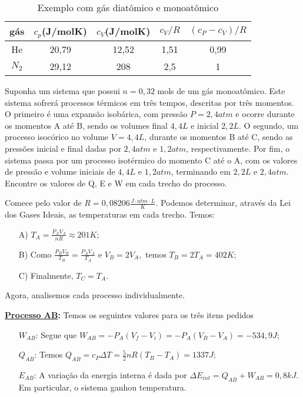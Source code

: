 \documentclass[phsyicsII_notes.tex]{subfiles}
\begin{document}
\begin{center}
	\begin{table}[h!]
		\caption{Exemplo com gás diatômico e monoatômico}
		\centering
		\begin{tabular}{| c | c | c | c | c |}
			\hline
			gás       & \(c_{p}\)(J/molK) & \(c_{V}\)(J/molK) & \(c_{V}/R\) & \((c_{P}-c_{V})/R\) \\
			\hline
			He        & 20,79             & 12,52             & 1,51        & 0,99                \\
			\(N_{2}\) & 29,12             & 208               & 2,5         & 1                   \\
			\hline
		\end{tabular}
	\end{table}
\end{center}
\begin{example}
	Suponha um sistema que possui \(n=0,32\) mols de um gás monoatômico. Este sistema sofrerá processos térmicos em três tempos,
	descritas por três momentos. O primeiro é uma expansão isobárica, com pressão \(P = 2,4atm\) e ocorre durante os momentos A até B, sendo os volumes final \(4,4L\) e inicial \(2,2L\). O segundo,
	um processo isocórico no volume \(V = 4,4L\), durante os momentos B até C, sendo as pressões inicial e final dadas por \(2,4atm\) e \(1,2atm\), respectivamente.
	Por fim, o sistema passa por um processo isotérmico do momento C até o A, com os valores de pressão e volume iniciais de \(4,4L\) e \(1,2atm\), terminando
	em \(2,2L\) e \(2,4atm\). Encontre os valores de Q, E e W em cada trecho do processo.

	Comece pelo valor de \(R = 0,08206 \frac{J \cdot atm \cdot L}{K}\). Podemos determinar, através da Lei dos Gases Ideais,
	as temperaturas em cada trecho. Temos:
	\begin{itemize}
		\item[A)] \(T_{A} = \frac{P_{A}V_{A}}{nR}\approx 201K\);
		\item[B)] Como \(\frac{P_{B}V_{B}}{T_{B}} = \frac{P_{A}V_{A}}{T_{A}}\) e \(V_{B} = 2V_{A},\) temos \(T_{B} = 2T_{A} = 402K;\)
		\item[C)] Finalmente, \(T_{C} = T_{A}.\)
	\end{itemize}
	Agora, analisemos cada processo individualmente.

	\textbf{\underline{Processo AB}:} Temos os seguintes valores para os três itens pedidos
	\begin{itemize}
		\item[\(W_{AB}\):] Segue que \(W_{AB} = -P_{A}(V_{f}-V_{i}) = -P_{A}(V_{B}-V_{A}) = -534,9J\);
		\item[\(Q_{AB}\):] Temos \(Q_{AB} = c_{P}\Delta T = \frac{5}{2}nR(T_{B}-T_{A}) = 1337J\);
		\item[\(E_{AB}\):] A variação da energia interna é dada por \(\Delta E_{int} = Q_{AB} + W_{AB} = 0,8kJ.\) Em particular,
		      o sistema ganhou temperatura.
	\end{itemize}


\end{example}
\end{document}
